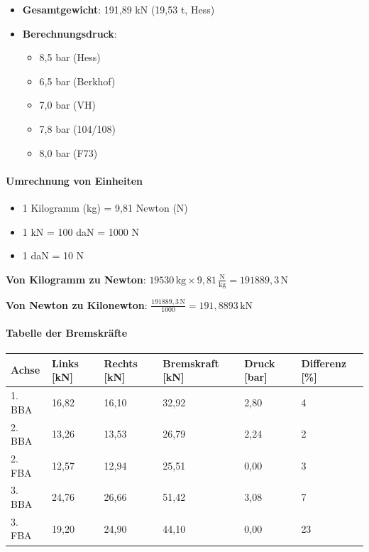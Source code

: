 \documentclass{vorlage-design-main}
\begin{document}
\begin{itemize}

\item
  \textbf{Gesamtgewicht}: 191,89 kN (19,53 t, Hess)
\item
  \textbf{Berechnungsdruck}:

  \begin{itemize}

  \item
    8,5 bar (Hess)
  \item
    6,5 bar (Berkhof)
  \item
    7,0 bar (VH)
  \item
    7,8 bar (104/108)
  \item
    8,0 bar (F73)
  \end{itemize}
\end{itemize}

\paragraph{Umrechnung von Einheiten}\label{umrechnung-von-einheiten}

\begin{itemize}

\item
  1 Kilogramm (kg) = 9,81 Newton (N)
\item
  1 kN = 100 daN = 1000 N
\item
  1 daN = 10 N
\end{itemize}

\textbf{Von Kilogramm zu Newton}:
$19530 \, \text{kg} \times 9,81 \, \frac{\text{N}}{\text{kg}} = 191889,3 \, \text{N}$

\textbf{Von Newton zu Kilonewton}:
$\frac{191889,3 \, \text{N}}{1000} = 191,8893 \, \text{kN}$

\paragraph{Tabelle der Bremskräfte}\label{tabelle-der-bremskraefte}

\begin{table}[ht]
  \begin{tabular}{@{}llllll@{}}
\toprule
Achse
 &
Links {[}kN{]}
 &
Rechts {[}kN{]}
 &
Bremskraft {[}kN{]}
 &
Druck {[}bar{]}
 &
Differenz {[}\%{]}
 \\
\midrule[\heavyrulewidth]
1. BBA & 16,82 & 16,10 & 32,92 & 2,80 & 4 \\
2. BBA & 13,26 & 13,53 & 26,79 & 2,24 & 2 \\
2. FBA & 12,57 & 12,94 & 25,51 & 0,00 & 3 \\
3. BBA & 24,76 & 26,66 & 51,42 & 3,08 & 7 \\
3. FBA & 19,20 & 24,90 & 44,10 & 0,00 & 23 \\
\bottomrule
\end{tabular}%
\end{table}
\end{document}
